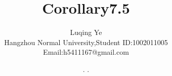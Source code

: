 \documentclass[a4paper, 12pt]{article} %
\makeatletter
\renewcommand{\maketitle}{ %
  \newcommand{\D}{\displaystyle}\newcommand{\ri}{\Rightarrow}
  \newcommand{\ds}{\displaystyle} \renewcommand{\ni}{\noindent}
  \newcommand{\pa}{\partial} \newcommand{\Om}{\Omega}
  \newcommand{\om}{\omega} \newcommand{\sik}{\sum_{i=1}^k}
  \newcommand{\vov}{\Vert\omega\Vert} \newcommand{\Umy}{U_{\mu_i,y^i}}
  \newcommand{\lamns}{\lambda_n^{^{\scriptstyle\sigma}}}
  \newcommand{\chiomn}{\chi_{_{\Omega_n}}}
  \newcommand{\ullim}{\underline{\lim}} \newcommand{\bsy}{\boldsymbol}
  \newcommand{\mvb}{\mathversion{bold}} \newcommand{\la}{\lambda}
  \newcommand{\La}{\Lambda} \newcommand{\va}{\varepsilon}
  \newcommand{\be}{\beta} \newcommand{\al}{\alpha}
  \newcommand{\dis}{\displaystyle} \newcommand{\R}{{\mathbb R}}
  \newcommand{\N}{{\mathbb N}} \newcommand{\cF}{{\mathcal F}}
  \newcommand{\gB}{{\mathfrak B}} \newcommand{\eps}{\epsilon}
  \begin{flushright} %
    {\LARGE\@title} %
    
    \vspace{50pt} %
    
    {\large\@author} %
    \\\@date %
    
    \vspace{40pt} %
  \end{flushright}
}
\makeatother
\begin{document}
\begin{CJK}{UTF8}{gkai}
  \title{\textbf{Corollary7.5}}
  \author{\small{Luqing Ye}\\{\small{Hangzhou Normal
        University,Student
        ID:1002011005}}\\{\small{Email:h5411167@gmail.com}}} %
  \renewcommand{\today}{\number\year. \number\month. \number\day}
  \date{\today} %
  
  
  
  \maketitle %
  
  
  
  
  
  
  

\end{CJK}
\end{document}
